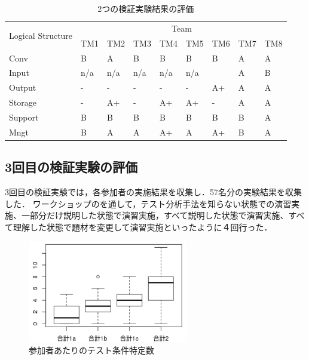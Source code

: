 \documentclass[a4paper,10pt]{jreport}
\begin{document}
\begin{table}[htbp]
\footnotesize
  \centering
  \caption{2つの検証実験結果の評価}
    \begin{tabular}{|l|l|l|l|l|l|l|l|l|}
    \hline
    \multicolumn{1}{|c|}{\multirow{2}[4]{*}{Logical
Structure}} & \multicolumn{8}{c|}{Team} \bigstrut\\
\cline{2-9}          & TM1   & TM2   & TM3   & TM4   & TM5   & TM6 & TM7 & TM8 \bigstrut\\
    \hline
    Conv  & B     & A     & B     & B     & B     & B & A     & A\bigstrut\\
    \hline
    Input &  n/a     &   n/a    &   n/a    &   n/a    &   n/a    &  & A     & B   \bigstrut\\
    \hline
    Output & -     & -     & -     & -     & -     & A+ & A     & A \bigstrut\\
    \hline
    Storage & -     & A+    & -     & A+    & A+    & -& A     & A  \bigstrut\\
    \hline
    Support & B     & B     & B     & B     & B     & B& B     & A \bigstrut[t]\\
    Mngt  & B     & A     & A     & A+    & A     & A+& B     & A \bigstrut[b]\\
    \hline
    \end{tabular}%
  \label{tbl:D-3-tbl5}%
\end{table}%

\subsection{3回目の検証実験の評価}
3回目の検証実験では，各参加者の実施結果を収集し．57名分の実験結果を収集した．
ワークショップのを通して，テスト分析手法を知らない状態での演習実施、一部分だけ説明した状態で演習実施，すべて説明した状態で演習実施、すべて理解した状態で題材を変更して演習実施といったように４回行った．
\begin{figure}[h]
  \begin{center}
  \includegraphics[width=7cm]{./image/D-3-Fig10.png}
  \caption{参加者あたりのテスト条件特定数}
  \label{fig:D-3-Fig10}
  \end{center}
\end{figure}
\end{document}
